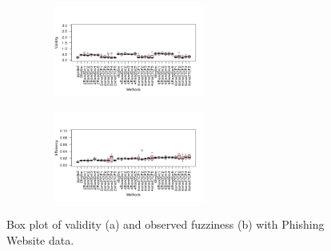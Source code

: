 \documentclass[main]{subfiles}
\begin{document}
\begin{figure}[h]
\centering
\begin{subfigure}{.5\textwidth}
  \centering
  \includegraphics[width=6cm,height=3cm]{images/boxplotPhish}
\end{subfigure}%
\begin{subfigure}{.5\textwidth}
  \centering
  \includegraphics[width=6cm,height=3cm]{images/boxplotPhish_eff}
\end{subfigure}%
\caption{Box plot of validity (a) and observed fuzziness (b) with Phishing Website data.} \label{fig:boxplotPhish}
\end{figure}
\end{document}

